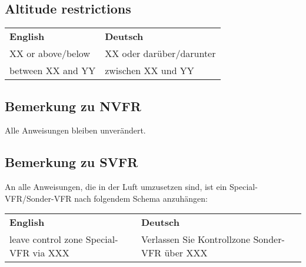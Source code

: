 \subsection{Altitude restrictions}
\begin{table}[H]
	\begin{tabularx}{\textwidth}{XX}
		\textbf{English} & \textbf{Deutsch} \\
		XX or above/below & XX oder darüber/darunter \\
		between XX and YY & zwischen XX und YY      
	\end{tabularx}%
\end{table}

\subsection{Bemerkung zu NVFR}
Alle Anweisungen bleiben unverändert.

\subsection{Bemerkung zu SVFR}
An alle Anweisungen, die in der Luft umzusetzen sind, ist ein Special-VFR/Sonder-VFR nach folgendem Schema anzuhängen:
\begin{table}[H]
	\begin{tabularx}{\textwidth}{XX}
		\textbf{English} & \textbf{Deutsch} \\
		leave control zone Special-VFR via XXX&Verlassen Sie Kontrollzone Sonder-VFR über XXX
	\end{tabularx}%
\end{table}


